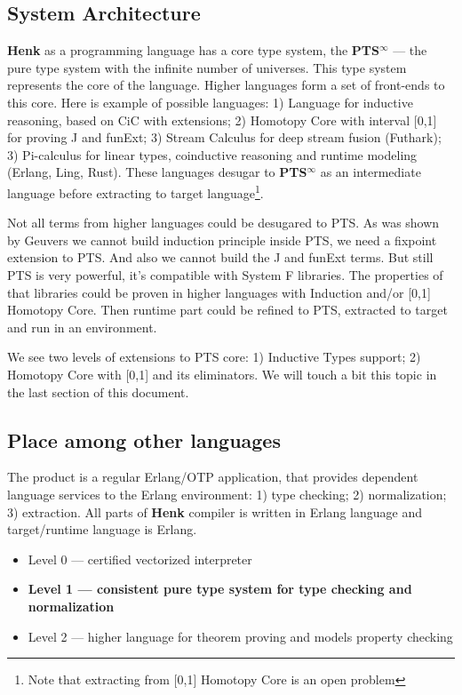 \documentclass{article}
\begin{document}
\subsection{System Architecture}
{\bf Henk} as a programming language has a core type system, the {\bf PTS$^{\infty}$} --- the pure type system with the infinite number of universes.
This type system represents the core of the language.
Higher languages form a set of front-ends to this core.
 Here is example of possible languages:
1) Language for inductive reasoning, based on CiC with extensions;
2) Homotopy Core with interval [0,1] for proving J and funExt;
3) Stream Calculus for deep stream fusion (Futhark);
3) Pi-calculus for linear types, coinductive reasoning and runtime modeling (Erlang, Ling, Rust).
These languages desugar to {\bf PTS$^{\infty}$} as an intermediate language before extracting to target language\footnote{Note that extracting from [0,1] Homotopy Core is an open problem}.

Not all terms from higher languages could be desugared to PTS.
As was shown by Geuvers\cite{Geuvers01} we cannot build induction principle inside PTS, we need a fixpoint extension to PTS.
And also we cannot build the J and funExt terms.
But still PTS is very powerful, it's compatible with System F libraries.
The properties of that libraries could be proven in higher languages with Induction and/or [0,1] Homotopy Core.
Then runtime part could be refined to PTS, extracted to target and run in an environment.

We see two levels of extensions to PTS core: 1) Inductive Types support; 2) Homotopy Core with [0,1] and its eliminators.
We will touch a bit this topic in the last section of this document.

\subsection{Place among other languages}
The product is a regular Erlang/OTP application, that provides dependent language services to the Erlang environment: 1) type checking; 2) normalization; 3) extraction.
All parts of {\bf Henk} compiler is written in Erlang language and target/runtime language is Erlang.

\begin{itemize}
\item Level 0 --- certified vectorized interpreter
\item {\bf Level 1 --- consistent pure type system for type checking and normalization}
\item Level 2 --- higher language for theorem proving and models property checking
\end{itemize}
\end{document}
